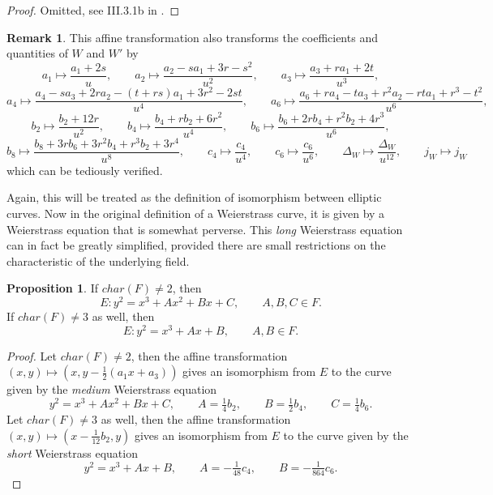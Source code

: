 \documentclass{article}
\newcommand{\rb}[1]{\left( #1 \right)}
\theoremstyle{definition}
\newtheorem*{remark}{Remark}
\newtheorem{proposition}{Proposition}[subsection]
\begin{document}
\begin{proof}
Omitted, see III.3.1b in \cite{gtm}.
\end{proof}

\begin{remark}
This affine transformation also transforms the coefficients and quantities of $ W $ and $ W' $ by
$$ a_1 \mapsto \dfrac{a_1 + 2s}{u}, \qquad a_2 \mapsto \dfrac{a_2 - sa_1 + 3r - s^2}{u^2}, \qquad a_3 \mapsto \dfrac{a_3 + ra_1 + 2t}{u^3}, $$
$$ a_4 \mapsto \dfrac{a_4 - sa_3 + 2ra_2 - \rb{t + rs}a_1 + 3r^2 - 2st}{u^4}, \qquad a_6 \mapsto \dfrac{a_6 + ra_4 - ta_3 + r^2a_2 - rta_1 + r^3 - t^2}{u^6}, $$
$$ b_2 \mapsto \dfrac{b_2 + 12r}{u^2}, \qquad b_4 \mapsto \dfrac{b_4 + rb_2 + 6r^2}{u^4}, \qquad b_6 \mapsto \dfrac{b_6 + 2rb_4 + r^2b_2 + 4r^3}{u^6}, $$
$$ b_8 \mapsto \dfrac{b_8 + 3rb_6 + 3r^2b_4 + r^3b_2 + 3r^4}{u^8}, \qquad c_4 \mapsto \dfrac{c_4}{u^4}, \qquad c_6 \mapsto \dfrac{c_6}{u^6}, \qquad \Delta_W \mapsto \dfrac{\Delta_W}{u^{12}}, \qquad j_W \mapsto j_W $$
which can be tediously verified.
\end{remark}

Again, this will be treated as the definition of isomorphism between elliptic curves. Now in the original definition of a Weierstrass curve, it is given by a Weierstrass equation that is somewhat perverse. This \emph{long} Weierstrass equation can in fact be greatly simplified, provided there are small restrictions on the characteristic of the underlying field.

\begin{proposition}
If $ char\rb{F} \ne 2 $, then
$$ E : y^2 = x^3 + Ax^2 + Bx + C, \qquad A, B, C \in F. $$
If $ char\rb{F} \ne 3 $ as well, then
$$ E : y^2 = x^3 + Ax + B, \qquad A, B \in F. $$
\end{proposition}

\begin{proof}
Let $ char\rb{F} \ne 2 $, then the affine transformation $ \rb{x, y} \mapsto \rb{x, y - \tfrac{1}{2}\rb{a_1x + a_3}} $ gives an isomorphism from $ E $ to the curve given by the \emph{medium} Weierstrass equation
$$ y^2 = x^3 + Ax^2 + Bx + C, \qquad A = \tfrac{1}{4}b_2, \qquad B = \tfrac{1}{2}b_4, \qquad C = \tfrac{1}{4}b_6. $$
Let $ char\rb{F} \ne 3 $ as well, then the affine transformation $ \rb{x, y} \mapsto \rb{x - \tfrac{1}{12}b_2, y} $ gives an isomorphism from $ E $ to the curve given by the \emph{short} Weierstrass equation
$$ y^2 = x^3 + Ax + B, \qquad A = -\tfrac{1}{48}c_4, \qquad B = -\tfrac{1}{864}c_6. $$
\end{proof}
\end{document}
